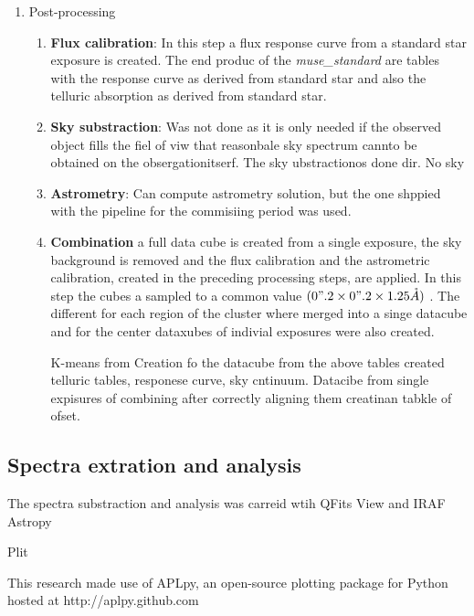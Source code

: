 \begin{enumerate}
\begin{enumerate}[I]
    \end{enumerate}
\item Post-processing
                \begin{enumerate}[I]
			\item \textbf{Flux calibration}:  In this step a flux response curve from a standard star exposure is created. The end produc of the \emph{muse_standard} are tables with the response curve as derived from standard star and also the telluric absorption as derived from standard star.
                        \item \textbf{Sky substraction}: Was not done as it is only needed if the observed object fills the fiel of viw that reasonbale sky spectrum cannto be obtained on the obsergationitserf. The sky ubstractionos done dir. No sky  
                        \item \textbf{Astrometry}: Can compute astrometry solution, but the one shppied with the pipeline for the commisiing period was used. 
			\item \textbf{Combination} a full data cube is created from a single exposure, the sky background is removed and the flux calibration and the astrometric calibration, created in the preceding processing steps, are applied. In this step the cubes a sampled to a common value $(0".2 \times 0".2 \times 1.25 \mathring{A})$ . The different for each region of the cluster where merged into a singe datacube and for the center dataxubes of indivial exposures were also created.  
				
				K-means from Creation fo the datacube from the above tables created telluric tables, responese curve, sky cntinuum. Datacibe from single expisures of combining after correctly aligning them creatinan tabkle of ofset. 
                \end{enumerate}
\end{enumerate}


\subsection{Spectra extration and analysis}

The spectra substraction and analysis was carreid wtih QFits View and IRAF \citep{1986SPIE..627..733T}
Astropy \citep{astropy_collaboration_astropy_2013}

Plit

This research made use of APLpy, an open-source plotting package for Python hosted at http://aplpy.github.com

